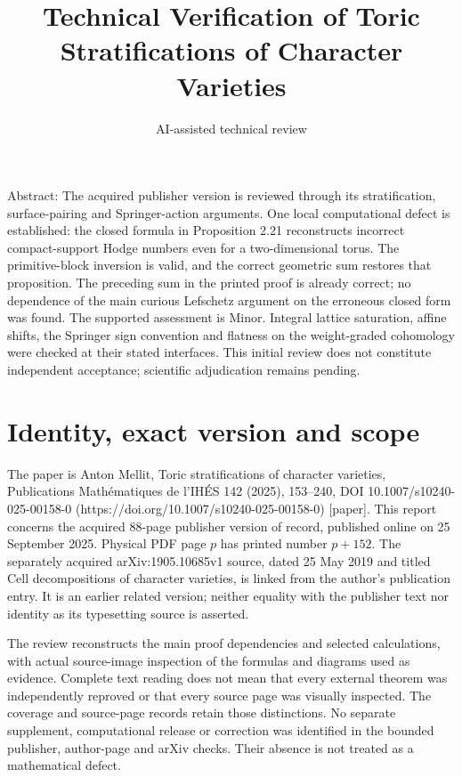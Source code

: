 \documentclass[10pt]{article}
\title{Technical Verification of
Toric Stratifications of Character Varieties}
\author{AI-assisted technical review}
\date{}
\begin{document}
\maketitle
Abstract: The acquired publisher version is reviewed through its stratification, surface-pairing and Springer-action arguments. One local computational defect is established: the closed formula in Proposition 2.21 reconstructs incorrect compact-support Hodge numbers even for a two-dimensional torus. The primitive-block inversion is valid, and the correct geometric sum restores that proposition. The preceding sum in the printed proof is already correct; no dependence of the main curious Lefschetz argument on the erroneous closed form was found. The supported assessment is Minor. Integral lattice saturation, affine shifts, the Springer sign convention and flatness on the weight-graded cohomology were checked at their stated interfaces. This initial review does not constitute independent acceptance; scientific adjudication remains pending.\par
\section*{Identity, exact version and scope}
The paper is Anton Mellit, Toric stratifications of character varieties, Publications Mathématiques de l’IHÉS 142 (2025), 153–240, DOI 10.1007/s10240-025-00158-0 (https://doi.org/10.1007/s10240-025-00158-0) [paper]. This report concerns the acquired 88-page publisher version of record, published online on 25 September 2025. Physical PDF page \(p\) has printed number \(p+152\). The separately acquired arXiv:1905.10685v1 source, dated 25 May 2019 and titled Cell decompositions of character varieties, is linked from the author’s publication entry. It is an earlier related version; neither equality with the publisher text nor identity as its typesetting source is asserted.\par
The review reconstructs the main proof dependencies and selected calculations, with actual source-image inspection of the formulas and diagrams used as evidence. Complete text reading does not mean that every external theorem was independently reproved or that every source page was visually inspected. The coverage and source-page records retain those distinctions. No separate supplement, computational release or correction was identified in the bounded publisher, author-page and arXiv checks. Their absence is not treated as a mathematical defect.\par
\end{document}
